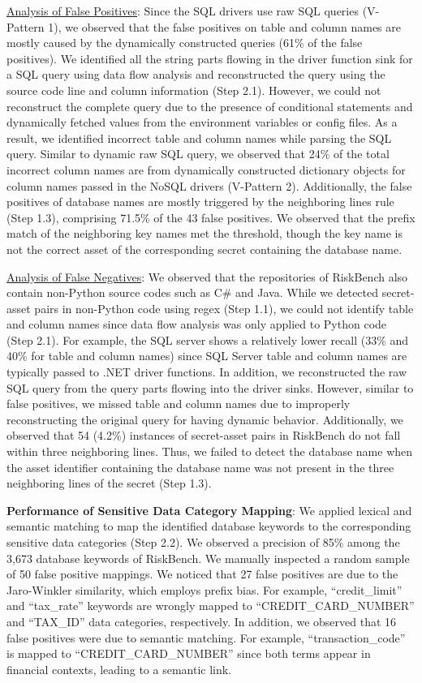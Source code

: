 \uline{Analysis of False Positives}: Since the SQL drivers use raw SQL queries (V-Pattern 1), we observed that the false positives on table and column names are mostly caused by the dynamically constructed queries (61\% of the false positives). We identified all the string parts flowing in the driver function sink for a SQL query using data flow analysis and reconstructed the query using the source code line and column information (Step 2.1). However, we could not reconstruct the complete query due to the presence of conditional statements and dynamically fetched values from the environment variables or config files. As a result, we identified incorrect table and column names while parsing the SQL query. Similar to dynamic raw SQL query, we observed that 24\% of the total incorrect column names are from dynamically constructed dictionary objects for column names passed in the NoSQL drivers (V-Pattern 2). Additionally, the false positives of database names are mostly triggered by the neighboring lines rule (Step 1.3), comprising 71.5\% of the 43 false positives. We observed that the prefix match of the neighboring key names met the threshold, though the key name is not the correct asset of the corresponding secret containing the database name.


\uline{Analysis of False Negatives}: We observed that the repositories of RiskBench also contain non-Python source codes such as C\# and Java. While we detected secret-asset pairs in non-Python code using regex (Step 1.1), we could not identify table and column names since data flow analysis was only applied to Python code (Step 2.1). For example, the SQL server shows a relatively lower recall (33\% and 40\% for table and column names) since SQL Server table and column names are typically passed to .NET driver functions. In addition, we reconstructed the raw SQL query from the query parts flowing into the driver sinks. However, similar to false positives, we missed table and column names due to improperly reconstructing the original query for having dynamic behavior. Additionally, we observed that 54 (4.2\%) instances of secret-asset pairs in RiskBench do not fall within three neighboring lines. Thus, we failed to detect the database name when the asset identifier containing the database name was not present in the three neighboring lines of the secret (Step 1.3).

\textbf{Performance of Sensitive Data Category Mapping}: We applied lexical and semantic matching to map the identified database keywords to the corresponding sensitive data categories (Step 2.2). We observed a precision of 85\% among the 3,673 database keywords of RiskBench. We manually inspected a random sample of 50 false positive mappings. We noticed that 27 false positives are due to the Jaro-Winkler similarity, which employs prefix bias. For example, ``credit\_limit'' and ``tax\_rate'' keywords are wrongly mapped to ``CREDIT\_CARD\_NUMBER'' and ``TAX\_ID'' data categories, respectively. In addition, we observed that 16 false positives were due to semantic matching. For example, ``transaction\_code'' is mapped to ``CREDIT\_CARD\_NUMBER'' since both terms appear in financial contexts, leading to a semantic link.   

